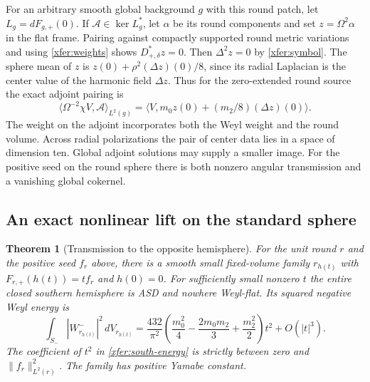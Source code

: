 \documentclass[11pt]{article}
\numberwithin{equation}{section}
\newtheorem{theorem}{Theorem}[section]
\theoremstyle{definition}
\theoremstyle{remark}
\begin{document}
For an arbitrary smooth global background \(g\) with this round
patch, let \(L_g=dF_{g,+}(0)\). If \(\mathcal A\in\ker L_g^*\),
let \(\alpha\) be its round components and set \(z=\Omega^2\alpha\)
in the flat frame. Pairing against compactly supported round metric
variations and using \eqref{xfer:weights} shows \(D_{+,\delta}^*z=0\).
Then \(\Delta^2z=0\) by \eqref{xfer:symbol}. The sphere mean of \(z\)
is \(z(0)+\rho^2(\Delta z)(0)/8\), since its radial Laplacian
is the center value of the harmonic field \(\Delta z\).
Thus for the zero-extended round source the exact adjoint pairing is
\begin{equation}\label{xfer:center}
 \langle \Omega^{-2}\chi V,\mathcal A\rangle_{L^2(g)}
 =\bigl\langle V,m_0 z(0)+(m_2/8)(\Delta z)(0)\bigr\rangle .
\end{equation}
The weight on the adjoint incorporates both the Weyl weight and
the round volume. Across radial polarizations the pair of center
data lies in a space of dimension ten. Global adjoint solutions
may supply a smaller image. For the positive seed on the round sphere there is both nonzero
angular transmission and a vanishing global cokernel.

\subsection{An exact nonlinear lift on the standard sphere}

\begin{theorem}[Transmission to the opposite hemisphere]\label{xfer:nonlinear-round}
For the unit round \(r\) and the positive seed \(f_r\) above,
there is a smooth small fixed-volume family \(r_{h(t)}\) with
\(F_{r,+}(h(t))=tf_r\) and \(h(0)=0\).
For sufficiently small nonzero \(t\) the entire closed southern
hemisphere is ASD and nowhere Weyl-flat. Its squared negative
Weyl energy is
\begin{equation}\label{xfer:south-energy}
 \int_{S_-}|W_{r_{h(t)}}^-|^2\,dV_{r_{h(t)}}
 =\frac{432}{\pi^2}
   \left(\frac{m_0^2}{4}-\frac{2m_0m_2}{3}+\frac{m_2^2}{2}\right)t^2
   +O(|t|^3).
\end{equation}
The coefficient of \(t^2\) in \eqref{xfer:south-energy} is strictly
between zero and \(\|f_r\|_{L^2(r)}^2\). The family has positive
Yamabe constant.
\end{theorem}
\end{document}
